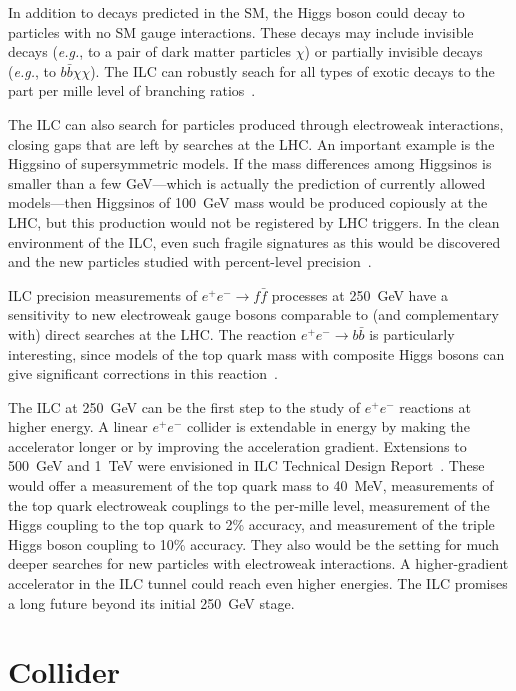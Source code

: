 \documentclass[%
 reprint,
 amsmath,amssymb,
 aps,
]{revtex4-1}
\def\eg{{\it e.g.}}
\def\ee{e^+e^-}
\begin{document}
In addition to decays predicted in the SM, the Higgs boson could decay
to particles with no SM gauge interactions.    These decays may
include invisible decays (\eg, to a pair of dark matter particles $\chi$)  or
partially invisible decays (\eg, to $b\bar b \chi \chi$).   The ILC
can robustly seach for all types of exotic decays  to the part per
mille level of branching ratios~\cite{Liu:2016zki}.

The ILC can also search for particles produced through electroweak
interactions, closing gaps that are left by searches at the LHC.  An
important example is the Higgsino of supersymmetric models.   If the
mass  differences among Higgsinos is smaller than a few GeV---which is
actually the prediction of currently allowed models---then Higgsinos
of 100~GeV mass would be produced copiously at the LHC, but this
production would not be registered by LHC triggers.  In the clean
environment 
of the ILC, even such fragile signatures as this 
would be discovered and the new particles 
studied with percent-level precision~\cite{Higgsino}.

 ILC precision
measurements of $\ee\to f\bar f$ processes at 250~GeV have a sensitivity to new
electroweak gauge bosons comparable to (and complementary with) 
direct searches at the LHC.  The reaction $\ee\to b\bar b$ is
particularly interesting, since models of the top quark mass with
composite Higgs bosons can give significant corrections in this
reaction~\cite{eetobb}.

The ILC at 250~GeV can be the first step to the study of $\ee$
reactions at higher energy.   A linear $\ee$ collider is extendable in
energy by making the accelerator longer or by improving the
acceleration gradient. Extensions to 500~GeV and 1~TeV were envisioned
in ILC Technical Design Report~\cite{Behnke:2013xla}.    These would offer a
measurement of the top quark mass to 40~MeV, measurements of the top
quark electroweak couplings to the per-mille level, measurement of the
Higgs coupling to the top quark to 2\% accuracy, and measurement of
the triple Higgs boson coupling to 10\%  accuracy. They  also would be
the setting for much 
deeper searches for new particles with electroweak interactions.
A higher-gradient accelerator in the ILC tunnel could reach even
higher energies.  The
ILC promises a long future beyond its initial 250~GeV stage.




\section{\label{sec:collider}Collider}
\end{document}
